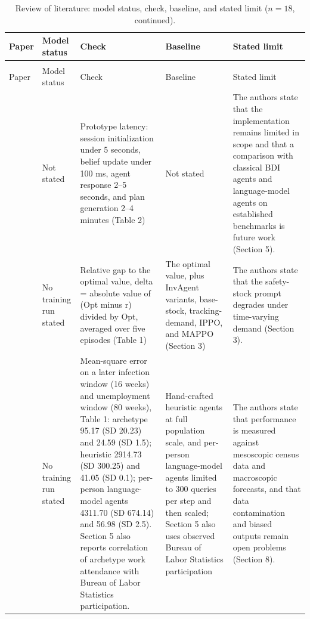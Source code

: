 \documentclass{icsthesis}
\begin{document}
\begin{mainmatter}
			\begingroup
			\footnotesize
			\setlength{\LTcapwidth}{\textwidth}
			\setlength{\tabcolsep}{3pt}
			\renewcommand{\arraystretch}{1.08}
			\begin{longtable}[l]{@{}>{\raggedright\arraybackslash}p{}>{\raggedright\arraybackslash}p{}>{\raggedright\arraybackslash}p{}>{\raggedright\arraybackslash}p{}>{\raggedright\arraybackslash}p{}@{}}
			\caption{Review of literature: model status, check, baseline, and stated limit ($n = 18$).}
			\label{tab:ch2-check}\\
			\hline\hline
			Paper & Model status & Check & Baseline & Stated limit \\
			\hline
			\endfirsthead
			\caption[]{Review of literature: model status, check, baseline, and stated limit ($n = 18$, continued).}\\
			\hline\hline
			Paper & Model status & Check & Baseline & Stated limit \\
			\hline
			\endhead
			\hline
			\endfoot
			\hline\hline
			\endlastfoot
			\citet{Asaf2025} & Not stated & Prototype latency: session initialization under 5 seconds, belief update under 100 ms, agent response 2--5 seconds, and plan generation 2--4 minutes (Table 2) & Not stated & The authors state that the implementation remains limited in scope and that a comparison with classical BDI agents and language-model agents on established benchmarks is future work (Section 5). \\
			\citet{Yoshizato2026} & No training run stated & Relative gap to the optimal value, delta = absolute value of (Opt minus r) divided by Opt, averaged over five episodes (Table 1) & The optimal value, plus InvAgent variants, base-stock, tracking-demand, IPPO, and MAPPO (Section 3) & The authors state that the safety-stock prompt degrades under time-varying demand (Section 3). \\
			\citet{Chopra2025} & No training run stated & Mean-square error on a later infection window (16 weeks) and unemployment window (80 weeks), Table 1: archetype 95.17 (SD 20.23) and 24.59 (SD 1.5); heuristic 2914.73 (SD 300.25) and 41.05 (SD 0.1); per-person language-model agents 4311.70 (SD 674.14) and 56.98 (SD 2.5). Section 5 also reports correlation of archetype work attendance with Bureau of Labor Statistics participation. & Hand-crafted heuristic agents at full population scale, and per-person language-model agents limited to 300 queries per step and then scaled; Section 5 also uses observed Bureau of Labor Statistics participation & The authors state that performance is measured against mesoscopic census data and macroscopic forecasts, and that data contamination and biased outputs remain open problems (Section 8). \\

\end{longtable}
\end{mainmatter}
\end{document}

